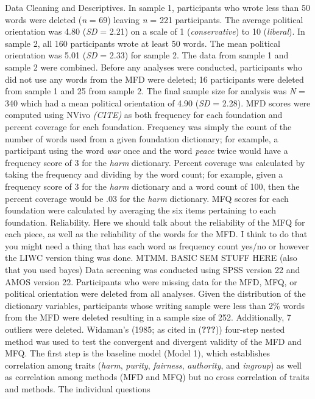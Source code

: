 \documentclass[english,man]{apa6}
\newcounter{author}
\theoremstyle{definition}
\theoremstyle{definition}
\theoremstyle{definition}
\theoremstyle{remark}
\begin{document}
Data Cleaning and Descriptives. In sample 1, participants who wrote less
than 50 words were deleted (\emph{n} = 69) leaving \emph{n} = 221
participants. The average political orientation was 4.80 (\emph{SD} =
2.21) on a scale of 1 (\emph{conservative}) to 10 (\emph{liberal}). In
sample 2, all 160 participants wrote at least 50 words. The mean
political orientation was 5.01 (\emph{SD} = 2.33) for sample 2. The data
from sample 1 and sample 2 were combined. Before any analyses were
conducted, participants who did not use any words from the MFD were
deleted; 16 participants were deleted from sample 1 and 25 from sample
2. The final sample size for analysis was \emph{N} = 340 which had a
mean political orientation of 4.90 (\emph{SD} = 2.28). MFD scores were
computed using NVivo \emph{(CITE)} as both frequency for each foundation
and percent coverage for each foundation. Frequency was simply the count
of the number of words used from a given foundation dictionary; for
example, a participant using the word \emph{war} once and the word
\emph{peace} twice would have a frequency score of 3 for the \emph{harm}
dictionary. Percent coverage was calculated by taking the frequency and
dividing by the word count; for example, given a frequency score of 3
for the \emph{harm} dictionary and a word count of 100, then the percent
coverage would be .03 for the \emph{harm} dictionary. MFQ scores for
each foundation were calculated by averaging the six items pertaining to
each foundation. Reliability. Here we should talk about the reliability
of the MFQ for each piece, as well as the reliability of the words for
the MFD. I think to do that you might need a thing that has each word as
frequency count yes/no or however the LIWC version thing was done. MTMM.
BASIC SEM STUFF HERE (also that you used bayes) Data screening was
conducted using SPSS version 22 and AMOS version 22. Participants who
were missing data for the MFD, MFQ, or political orientation were
deleted from all analyses. Given the distribution of the dictionary
variables, participants whose writing sample were less than 2\% words
from the MFD were deleted resulting in a sample size of 252.
Additionally, 7 outliers were deleted. Widaman's (1985; as cited in
({\textbf{???}})) four-step nested method was used to test the
convergent and divergent validity of the MFD and MFQ. The first step is
the baseline model (Model 1), which establishes correlation among traits
(\emph{harm}, \emph{purity}, \emph{fairness}, \emph{authority}, and
\emph{ingroup}) as well as correlation among methods (MFD and MFQ) but
no cross correlation of traits and methods. The individual questions
\end{document}
